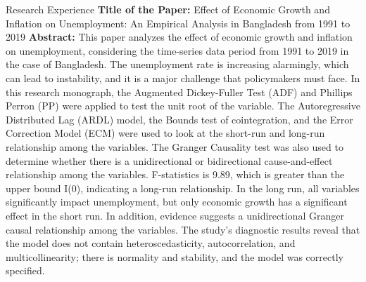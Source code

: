 \begin{rubric}{Research Experience}
\entry*[] \textbf{Title of the Paper: } Effect of Economic Growth and Inflation on Unemployment: An Empirical Analysis in Bangladesh from 1991 to 2019
%
\entry*[] \textbf{Abstract: } This paper analyzes the effect of economic growth and inflation on unemployment, considering the time-series data period from 1991 to 2019 in the case of Bangladesh. The unemployment rate is increasing alarmingly, which can lead to instability, and it is a major challenge that policymakers must face. In this research monograph, the Augmented Dickey-Fuller Test (ADF) and Phillips Perron (PP) were applied to test the unit root of the variable. The Autoregressive Distributed Lag (ARDL) model, the Bounds test of cointegration, and the Error Correction Model (ECM) were used to look at the short-run and long-run relationship among the variables. The Granger Causality test was also used to determine whether there is a unidirectional or bidirectional cause-and-effect relationship among the variables. F-statistics is 9.89, which is greater than the upper bound I(0), indicating a long-run relationship. In the long run, all variables significantly impact unemployment, but only economic growth has a significant effect in the short run. In addition, evidence suggests a unidirectional Granger causal relationship among the variables. The study's diagnostic results reveal that the model does not contain heteroscedasticity, autocorrelation, and multicollinearity; there is normality and stability, and the model was correctly specified.

\end{rubric}
